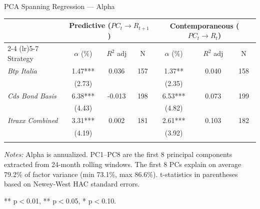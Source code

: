 \documentclass[aspectratio=169,11pt]{beamer}
\begin{document}
\begin{frame}[t]{PCA Spanning Regression — Alpha}
\centering
\scriptsize



\centering
\begin{threeparttable}
\begin{tabular}{lcccccc}
\toprule
 & \multicolumn{3}{c}{Predictive ($PC_t \to R_{t+1}$)} & \multicolumn{3}{c}{Contemporaneous ($PC_t \to R_t$)} \\
\cmidrule(lr){2-4} \cmidrule(lr){5-7}
Strategy & $\alpha$ (\%) & $R^2$ adj & N & $\alpha$ (\%) & $R^2$ adj & N \\
\midrule
\textit{Btp Italia} & 1.47*** & 0.036 & 157 & 1.37** & 0.040 & 158 \\
 & (2.73) & & & (2.35) & & \\
\addlinespace
\textit{Cds Bond Basis} & 6.38*** & -0.013 & 198 & 6.53*** & 0.073 & 199 \\
 & (4.43) & & & (4.82) & & \\
\addlinespace
\textit{Itraxx Combined} & 3.31*** & 0.002 & 181 & 2.61*** & 0.103 & 182 \\
 & (4.19) & & & (3.92) & & \\
\addlinespace
\bottomrule
\end{tabular}
\begin{tablenotes}
\small
\item \textit{Notes:} Alpha is annualized. PC1--PC8 are the first 8 principal components extracted from 24-month rolling windows. The first 8 PCs explain on average 79.2\% of factor variance (min 73.1\%, max 86.6\%). t-statistics in parentheses based on Newey-West HAC standard errors.
\item *** p$<$0.01, ** p$<$0.05, * p$<$0.10.
\end{tablenotes}
\end{threeparttable}


\end{frame}
\end{document}
